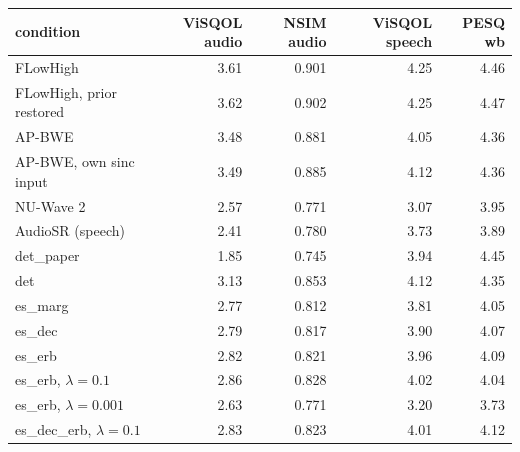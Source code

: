 \begin{tabular}{lrrrr}
\toprule
condition & ViSQOL audio & NSIM audio & ViSQOL speech & PESQ wb \\
\midrule
FLowHigh & 3.61 & 0.901 & 4.25 & 4.46 \\
FLowHigh, prior restored & 3.62 & 0.902 & 4.25 & 4.47 \\
AP-BWE & 3.48 & 0.881 & 4.05 & 4.36 \\
AP-BWE, own sinc input & 3.49 & 0.885 & 4.12 & 4.36 \\
NU-Wave 2 & 2.57 & 0.771 & 3.07 & 3.95 \\
AudioSR (speech) & 2.41 & 0.780 & 3.73 & 3.89 \\
det\_paper & 1.85 & 0.745 & 3.94 & 4.45 \\
det & 3.13 & 0.853 & 4.12 & 4.35 \\
es\_marg & 2.77 & 0.812 & 3.81 & 4.05 \\
es\_dec & 2.79 & 0.817 & 3.90 & 4.07 \\
es\_erb & 2.82 & 0.821 & 3.96 & 4.09 \\
es\_erb, $\lambda{=}0.1$ & 2.86 & 0.828 & 4.02 & 4.04 \\
es\_erb, $\lambda{=}0.001$ & 2.63 & 0.771 & 3.20 & 3.73 \\
es\_dec\_erb, $\lambda{=}0.1$ & 2.83 & 0.823 & 4.01 & 4.12 \\
\bottomrule
\end{tabular}
